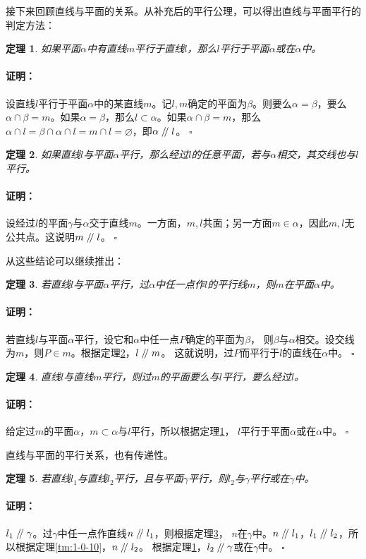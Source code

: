 \documentclass[12pt,UTF8]{ctexbook}
\newtheorem{tm}{定理}[section]
\renewenvironment{proof}{\paragraph{\textbf{证明：}}}{\hfill$\square$}
\renewcommand\parallel{\mathrel{/\mskip-4mu/}}
\begin{document}
接下来回顾直线与平面的关系。从补充后的平行公理，可以得出直线与平面平行的判定方法：

\begin{tm}\label{tm:1-0-20}
    如果平面$\alpha$中有直线$m$平行于直线$l$，那么$l$平行于平面$\alpha$或在$\alpha$中。
\end{tm}
\begin{proof}
    设直线$l$平行于平面$\alpha$中的某直线$m$。记$l,m$确定的平面为$\beta$。则要么$\alpha = \beta$，要么$\alpha\cap\beta = m$。如果$\alpha=\beta$，那么$l\subset\alpha$。如果$\alpha\cap\beta = m$，那么$\alpha\cap l= \beta\cap \alpha\cap l = m\cap l = \varnothing $，即$\alpha \parallel l$。
\end{proof}
\begin{tm}\label{tm:1-0-30}
    如果直线$l$与平面$\alpha$平行，那么经过$l$的任意平面，若与$\alpha$相交，其交线也与$l$平行。
\end{tm}
\begin{proof}
    设经过$l$的平面$\gamma$与$\alpha$交于直线$m$。一方面，$m,l$共面；另一方面$m\in\alpha$，因此$m,l$无公共点。这说明$m\parallel l$。
\end{proof}

从这些结论可以继续推出：
\begin{tm}\label{tm:1-0-40}
    若直线$l$与平面$\alpha$平行，过$\alpha$中任一点作$l$的平行线$m$，则$m$在平面$\alpha$中。
\end{tm}
\begin{proof}
    若直线$l$与平面$\alpha$平行，设它和$\alpha$中任一点$P$确定的平面为$\beta$，
    则$\beta$与$\alpha$相交。设交线为$m$，则$P\in m$。根据定理\ref{tm:1-0-30}，$l\parallel m$。
    这就说明，过$P$而平行于$l$的直线在$\alpha$中。
\end{proof}
\begin{tm}\label{tm:1-0-41}
    直线$l$与直线$m$平行，则过$m$的平面要么与$l$平行，要么经过$l$。
\end{tm}
\begin{proof}
    给定过$m$的平面$\alpha$，$m\subset \alpha$与$l$平行，所以根据定理\ref{tm:1-0-20}，
    $l$平行于平面$\alpha$或在$\alpha$中。
\end{proof}

直线与平面的平行关系，也有传递性。
\begin{tm}
    若直线$l_1$与直线$l_2$平行，且与平面$\gamma$平行，则$l_2$与$\gamma$平行或在$\gamma$中。
\end{tm}
\begin{proof}
    $l_1\parallel \gamma$。过$\gamma$中任一点作直线$n\parallel l_1$，则根据定理\ref{tm:1-0-40}，
    $n$在$\gamma$中。$n\parallel l_1$，$l_1\parallel l_2$，所以根据定理\ref{tm:1-0-10}，$n\parallel l_2$。
    根据定理\ref{tm:1-0-20}，$l_2\parallel \gamma$或在$\gamma$中。
\end{proof}
\end{document}
